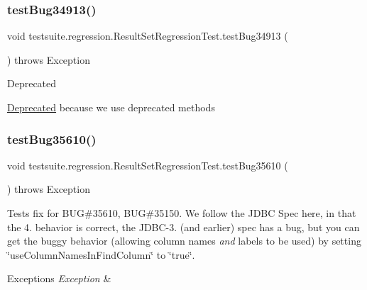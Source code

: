 \subsubsection{\texorpdfstring{test\+Bug34913()}{testBug34913()}}
{\footnotesize\ttfamily void testsuite.\+regression.\+Result\+Set\+Regression\+Test.\+test\+Bug34913 (\begin{DoxyParamCaption}{ }\end{DoxyParamCaption}) throws Exception}

\begin{DoxyRefDesc}{Deprecated}
\item[\mbox{\hyperlink{deprecated__deprecated000006}{Deprecated}}]because we use deprecated methods \end{DoxyRefDesc}
\mbox{\label{classtestsuite_1_1regression_1_1_result_set_regression_test_a8542bd8a4dd0127b113219d416c5be53}} 
\subsubsection{\texorpdfstring{test\+Bug35610()}{testBug35610()}}
{\footnotesize\ttfamily void testsuite.\+regression.\+Result\+Set\+Regression\+Test.\+test\+Bug35610 (\begin{DoxyParamCaption}{ }\end{DoxyParamCaption}) throws Exception}

Tests fix for B\+UG\#35610, B\+UG\#35150. We follow the J\+D\+BC Spec here, in that the 4. behavior is correct, the J\+D\+B\+C-\/3. (and earlier) spec has a bug, but you can get the buggy behavior (allowing column names {\itshape and} labels to be used) by setting \char`\"{}use\+Column\+Names\+In\+Find\+Column\char`\"{} to \char`\"{}true\char`\"{}.


\begin{DoxyExceptions}{Exceptions}
{\em Exception} & \\
\hline
\end{DoxyExceptions}
\mbox{\label{classtestsuite_1_1regression_1_1_result_set_regression_test_aabff0fcb9864462c3e2572817774d404}} 
